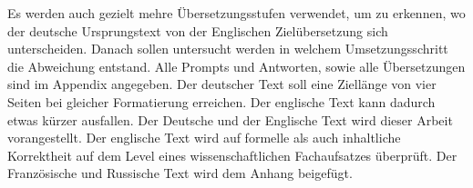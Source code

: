 Es werden auch gezielt mehre Übersetzungsstufen verwendet, um zu erkennen, wo der deutsche Ursprungstext von der Englischen Zielübersetzung sich unterscheiden. Danach sollen untersucht werden in welchem Umsetzungsschritt die Abweichung entstand.
Alle Prompts und Antworten, sowie alle Übersetzungen sind im Appendix angegeben.
Der deutscher Text soll eine Ziellänge von vier Seiten bei gleicher Formatierung erreichen. Der englische Text kann dadurch etwas kürzer ausfallen. Der Deutsche und der Englische Text wird dieser Arbeit vorangestellt. 
Der englische Text wird auf formelle als auch inhaltliche Korrektheit auf dem Level eines wissenschaftlichen Fachaufsatzes überprüft. Der Französische und Russische Text wird dem Anhang beigefügt.
